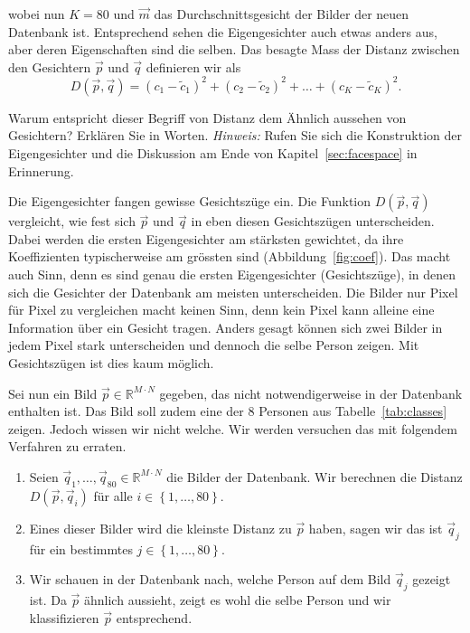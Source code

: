 wobei nun $K=80$ und $\vec m$ das Durchschnittsgesicht der Bilder der neuen Datenbank ist.
Entsprechend sehen die Eigengesichter auch etwas anders aus, aber deren Eigenschaften sind die selben.
Das besagte Mass der Distanz zwischen den Gesichtern $\vec p$ und $\vec q$ definieren wir als
\begin{equation*}
	D\left(\vec p,\vec q\right)=\left(c_1-\tilde c_1\right)^2+\left(c_2-\tilde c_2\right)^2+\ldots+\left(c_K-\tilde c_K\right)^2.
\end{equation*}
\begin{aufgabe} \label{aufg:quantification}
	Warum entspricht dieser Begriff von Distanz dem \glqq{}Ähnlich aussehen\grqq{} von Gesichtern?
	Erklären Sie in Worten.
	\textit{Hinweis:} Rufen Sie sich die Konstruktion der Eigengesichter und die Diskussion am Ende von Kapitel~\ref{sec:facespace} in Erinnerung.
\end{aufgabe}
\begin{losung*}
	Die Eigengesichter fangen gewisse Gesichtszüge ein.
	Die Funktion $D\left(\vec p,\vec q\right)$ vergleicht, wie fest sich $\vec p$ und $\vec q$ in eben diesen Gesichtszügen unterscheiden.
	Dabei werden die ersten Eigengesichter am stärksten gewichtet, da ihre Koeffizienten typischerweise am grössten sind (Abbildung~\ref{fig:coef}).
	Das macht auch Sinn, denn es sind genau die ersten Eigengesichter (Gesichtszüge), in denen sich die Gesichter der Datenbank am meisten unterscheiden.
	Die Bilder nur Pixel für Pixel zu vergleichen macht keinen Sinn, denn kein Pixel kann alleine eine Information über ein Gesicht tragen.
	Anders gesagt können sich zwei Bilder in jedem Pixel stark unterscheiden und dennoch die selbe Person zeigen.
	Mit Gesichtszügen ist dies kaum möglich.
\end{losung*}
Sei nun ein Bild $\vec p\in\mathbb R^{M\cdot N}$ gegeben, das nicht notwendigerweise in der Datenbank enthalten ist.
Das Bild soll zudem eine der 8 Personen aus Tabelle~\ref{tab:classes} zeigen.
Jedoch wissen wir nicht welche.
Wir werden versuchen das mit folgendem Verfahren zu erraten.
\begin{enumerate}[leftmargin=3cm, label=Schritt \arabic*:]
	\item Seien $\vec q_1,\ldots,\vec q_{80}\in\mathbb R^{M\cdot N}$ die Bilder der Datenbank.
	Wir berechnen die Distanz $D\left(\vec p,\vec q_i\right)$ für alle $i\in\left\{1,\ldots,80\right\}$.
	\item Eines dieser Bilder wird die kleinste Distanz zu $\vec p$ haben, sagen wir das ist $\vec q_j$ für ein bestimmtes $j\in\left\{1,\ldots,80\right\}$.
	\item Wir schauen in der Datenbank nach, welche Person auf dem Bild $\vec q_j$ gezeigt ist. Da $\vec p$ ähnlich aussieht, zeigt es wohl die selbe Person und wir klassifizieren $\vec p$ entsprechend.
\end{enumerate}
